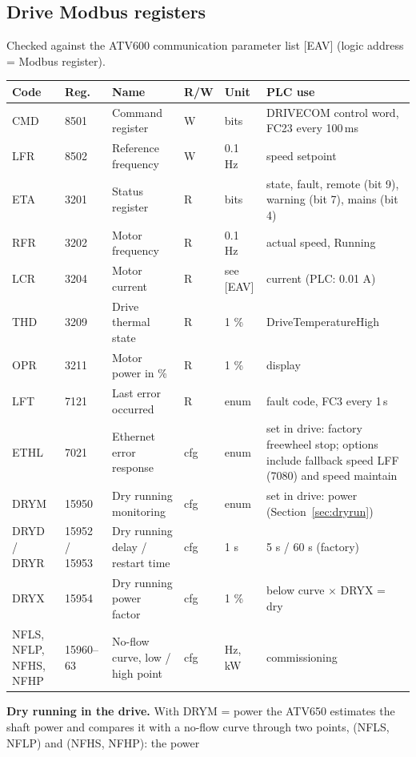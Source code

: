 \documentclass[11pt,a4paper]{article}
\begin{document}
\subsection{Drive Modbus registers}
Checked against the ATV600 communication parameter list [EAV] (logic address = Modbus register).
\begin{center}
\begin{small}
\begin{tabularx}{\textwidth}{@{}P{12mm}P{12mm}P{34mm}P{12mm}P{22mm}L@{}}
\toprule
Code & Reg. & Name & R/W & Unit & PLC use \\
\midrule
CMD & 8501 & Command register & W & bits & DRIVECOM control word, FC23 every 100\,ms \\
LFR & 8502 & Reference frequency & W & 0.1 Hz & speed setpoint \\
ETA & 3201 & Status register & R & bits & state, fault, remote (bit 9), warning (bit 7), mains (bit 4) \\
RFR & 3202 & Motor frequency & R & 0.1 Hz & actual speed, Running \\
LCR & 3204 & Motor current & R & see [EAV] & current (PLC: 0.01 A) \\
THD & 3209 & Drive thermal state & R & 1 \% & DriveTemperatureHigh \\
OPR & 3211 & Motor power in \% & R & 1 \% & display \\
LFT & 7121 & Last error occurred & R & enum & fault code, FC3 every 1\,s \\
ETHL & 7021 & Ethernet error response & cfg & enum & set in drive: factory freewheel stop; options include fallback speed LFF (7080) and speed maintain \\
DRYM & 15950 & Dry running monitoring & cfg & enum & set in drive: power (Section~\ref{sec:dryrun}) \\
DRYD / DRYR & 15952 / 15953 & Dry running delay / restart time & cfg & 1 s & 5 s / 60 s (factory) \\
DRYX & 15954 & Dry running power factor & cfg & 1 \% & below curve $\times$ DRYX = dry \\
NFLS, NFLP, NFHS, NFHP & 15960--63 & No-flow curve, low / high point & cfg & Hz, kW & commissioning \\
\bottomrule
\end{tabularx}
\end{small}
\end{center}
\label{sec:dryrun}\textbf{Dry running in the drive.} With DRYM = power the ATV650 estimates the shaft
power and compares it with a no-flow curve through two points, (NFLS, NFLP) and (NFHS, NFHP): the power
\end{document}
